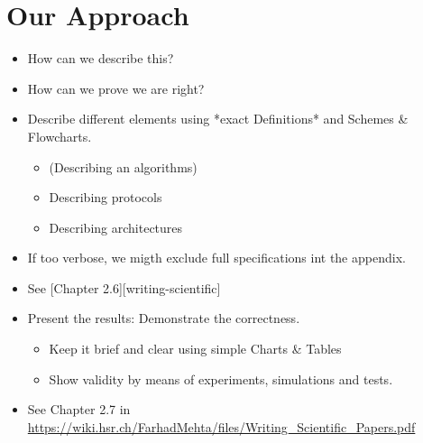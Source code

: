 \chapter{Our Approach}
\label{sec:our-approach}

\begin{itemize}
\item How can we describe this?
\item How can we prove we are right?
\item Describe different elements using *exact Definitions* and Schemes \& Flowcharts.
\begin{itemize}
	\item (Describing an algorithms)
	\item Describing protocols
	\item Describing architectures
\end{itemize}
\item If too verbose, we migth exclude full specifications int the appendix.
\item See [Chapter 2.6][writing-scientific]
\item Present the results: Demonstrate the correctness.
\begin{itemize}
	\item Keep it brief and clear using simple Charts \& Tables
	\item Show validity by means of experiments, simulations and tests.
\end{itemize}
\item See Chapter 2.7 in \url{https://wiki.hsr.ch/FarhadMehta/files/Writing_Scientific_Papers.pdf}
\end{itemize}

